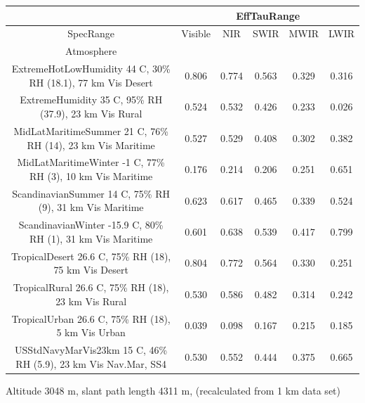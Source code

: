 \documentclass{workpackage}
\begin{document}
\begin{center}

\begin{footnotesize}

\begin{tabular}{|c|c|c|c|c|c|}
\hline
&\multicolumn{5}{|c|}{EffTauRange}\\\hline
SpecRange&Visible&NIR&SWIR&MWIR&LWIR\\\hline
Atmosphere&&&&&\\\hline
ExtremeHotLowHumidity 44 C, 30\% RH (18.1), 77 km Vis Desert&0.806&0.774&0.563&0.329&0.316\\\hline
ExtremeHumidity 35 C, 95\% RH (37.9), 23 km Vis Rural&0.524&0.532&0.426&0.233&0.026\\\hline
MidLatMaritimeSummer 21 C, 76\% RH (14), 23 km Vis Maritime&0.527&0.529&0.408&0.302&0.382\\\hline
MidLatMaritimeWinter -1 C, 77\% RH (3), 10 km Vis Maritime&0.176&0.214&0.206&0.251&0.651\\\hline
ScandinavianSummer 14 C, 75\% RH (9), 31 km Vis Maritime&0.623&0.617&0.465&0.339&0.524\\\hline
ScandinavianWinter -15.9 C, 80\% RH (1), 31 km Vis Maritime&0.601&0.638&0.539&0.417&0.799\\\hline
TropicalDesert 26.6 C, 75\% RH (18), 75 km Vis Desert&0.804&0.772&0.564&0.330&0.251\\\hline
TropicalRural 26.6 C, 75\% RH (18), 23 km Vis Rural&0.530&0.586&0.482&0.314&0.242\\\hline
TropicalUrban 26.6 C, 75\% RH (18), 5 km Vis Urban&0.039&0.098&0.167&0.215&0.185\\\hline
USStdNavyMarVis23km 15 C, 46\% RH (5.9), 23 km Vis Nav.Mar, SS4&0.530&0.552&0.444&0.375&0.665\\\hline

\end{tabular}
\end{footnotesize}
\end{center}



Altitude 3048 m, slant path length 4311 m, (recalculated from 1 km data set)
\end{document}
